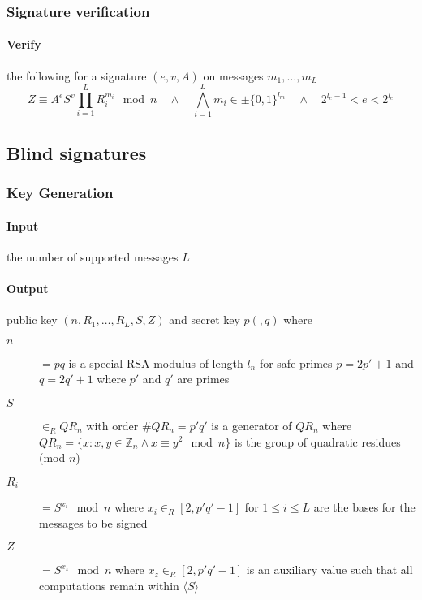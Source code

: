 \subsubsection{Signature verification}\label{sec:cl_basic-verify}

\paragraph{Verify} the following for a signature $(e, v, A)$ on messages $m_1, \dots, m_L$
\begin{equation*}
  Z \equiv A^e S^v \prod_{i=1}^{L} R_i^{m_i} \mod n
  \quad\land\quad
  \bigwedge_{i=1}^{L} m_i \in \pm \{0,1\}^{l_m}
  \quad\land\quad
  2^{l_e-1} < e < 2^{l_e}
\end{equation*}

\subsection{Blind signatures}\label{sec:cl_blind}

\subsubsection{Key Generation}\label{sec:cl_blind-keygen}

\paragraph{Input} the number of supported messages $L$

\paragraph{Output} public key $(n, R_1, \dots, R_L, S, Z)$ and secret key
  $p (, q)$ where
\begin{description}
  \item[$n$] $= pq$ is a special RSA modulus of length $l_n$ for safe primes
    $p = 2p' + 1$ and $q = 2q' + 1$ where $p'$ and $q'$ are primes
  \item[$S$] $\in_R QR_n$ with order $\#QR_n = p'q'$ is a generator of $QR_n$
    where $QR_n = \{ x : x,y \in \mathbb{Z}_n \land x \equiv y^2 \mod n \}$ is
    the group of quadratic residues (mod $n$)
  \item[$R_i$] $= S^{x_i} \mod n$ where $x_i \in_R [2, p'q' - 1]$ for
    $1 \leq i \leq L$ are the bases for the messages to be signed
  \item[$Z$] $= S^{x_z} \mod n$ where $x_z \in_R [2, p'q' - 1]$ is an auxiliary
    value such that all computations remain within $\langle S \rangle$
\end{description}

